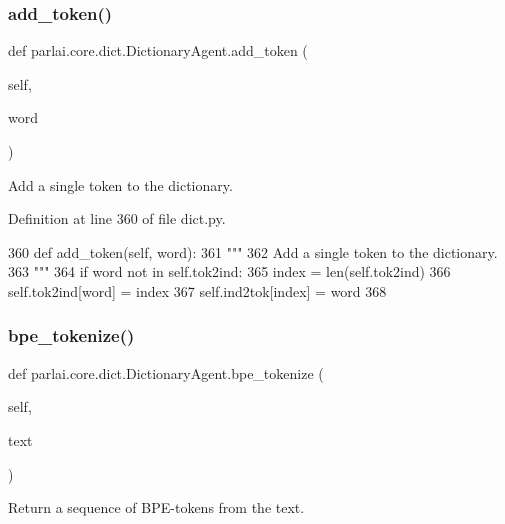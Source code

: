 \subsubsection{\texorpdfstring{add\+\_\+token()}{add\_token()}}
{\footnotesize\ttfamily def parlai.\+core.\+dict.\+Dictionary\+Agent.\+add\+\_\+token (\begin{DoxyParamCaption}\item[{}]{self,  }\item[{}]{word }\end{DoxyParamCaption})}

\begin{DoxyVerb}Add a single token to the dictionary.
\end{DoxyVerb}
 

Definition at line 360 of file dict.\+py.


\begin{DoxyCode}
360     \textcolor{keyword}{def }add\_token(self, word):
361         \textcolor{stringliteral}{"""}
362 \textcolor{stringliteral}{        Add a single token to the dictionary.}
363 \textcolor{stringliteral}{        """}
364         \textcolor{keywordflow}{if} word \textcolor{keywordflow}{not} \textcolor{keywordflow}{in} self.tok2ind:
365             index = len(self.tok2ind)
366             self.tok2ind[word] = index
367             self.ind2tok[index] = word
368 
\end{DoxyCode}
\mbox{\label{classparlai_1_1core_1_1dict_1_1DictionaryAgent_a520e4bc630cd60f075ad21632ef677a1}} 
\subsubsection{\texorpdfstring{bpe\+\_\+tokenize()}{bpe\_tokenize()}}
{\footnotesize\ttfamily def parlai.\+core.\+dict.\+Dictionary\+Agent.\+bpe\+\_\+tokenize (\begin{DoxyParamCaption}\item[{}]{self,  }\item[{}]{text }\end{DoxyParamCaption})}

\begin{DoxyVerb}Return a sequence of BPE-tokens from the text.
\end{DoxyVerb}
 

